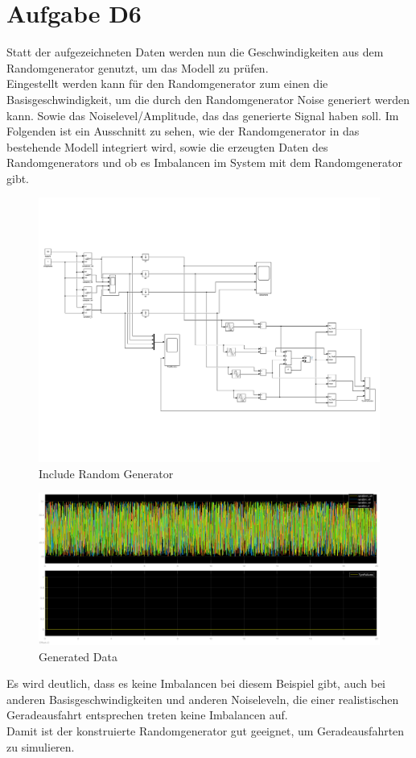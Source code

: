
\chapter{Aufgabe D6}
Statt der aufgezeichneten Daten werden nun die Geschwindigkeiten aus dem Randomgenerator genutzt, um das Modell zu prüfen. \\
Eingestellt werden kann für den Randomgenerator zum einen die Basisgeschwindigkeit, um die durch den Randomgenerator Noise generiert werden kann. Sowie das Noiselevel/Amplitude, das das generierte Signal haben soll. Im Folgenden ist ein Ausschnitt zu sehen, wie der Randomgenerator  in das bestehende Modell integriert wird, sowie die erzeugten Daten des Randomgenerators und ob es Imbalancen im System mit dem Randomgenerator gibt.
\begin{figure}[H]
	\centering
	\includegraphics[width=0.95\linewidth]{../Graphiken/TireSimRandom}
	\caption{Include Random Generator}
	\label{fig:randomGeneratorAusschnitt}
\end{figure}
\begin{figure}[H]
	\centering
	\includegraphics[width=0.95\linewidth]{../Graphiken/RandomGeneratorData}
	\caption{Generated Data}
	\label{fig:randomgeneratordata}
\end{figure}
Es wird deutlich, dass es keine Imbalancen bei diesem Beispiel gibt, auch bei anderen Basisgeschwindigkeiten und anderen Noiseleveln, die einer realistischen Geradeausfahrt entsprechen treten keine Imbalancen auf.\\
Damit ist der konstruierte Randomgenerator gut geeignet, um Geradeausfahrten zu simulieren.
